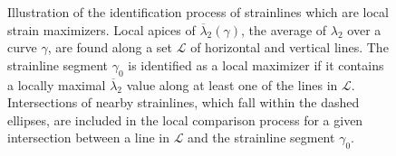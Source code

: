 \begin{figure}[htpb]
    \centering
    
    \caption[The identification process of strainlines which HOES BE AT BOI YE BOI BOII YE BOIIIII
    are local strain maximizers]{Illustration of the identification process of
        strainlines which are local strain maximizers.
        Local apices of $\overline{\lambda}_{2}(\gamma)$, the average of
        $\lambda_{2}$ over a curve $\gamma$, are found along a set $\mathcal{L}$
        of horizontal and vertical lines. The strainline segment
    $\gamma_{0}$ is identified as a local maximizer if it contains a locally
maximal $\overline{\lambda}_{2}$ value along at least one of the lines in
$\mathcal{L}$. Intersections of nearby strainlines, which fall within the dashed
ellipses, are included in the local comparison process for a given intersection
between a line in $\mathcal{L}$ and the strainline segment $\gamma_{0}$.}
    \label{fig:xi2err}
\end{figure}
